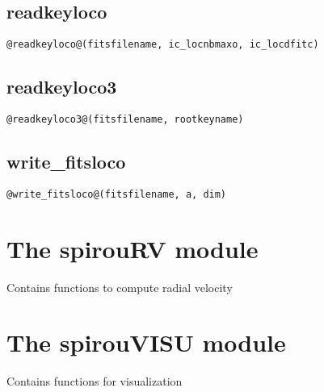 \subsection{readkeyloco}
\begin{lstlisting}[style=pythonstyle]
@readkeyloco@(fitsfilename, ic_locnbmaxo, ic_locdfitc)
\end{lstlisting}

\subsection{readkeyloco3}
\begin{lstlisting}[style=pythonstyle]
@readkeyloco3@(fitsfilename, rootkeyname)
\end{lstlisting}

\subsection{write\_fitsloco}
\begin{lstlisting}[style=pythonstyle]
@write_fitsloco@(fitsfilename, a, dim)
\end{lstlisting}


\clearpage
\newpage
\section{The spirouRV module}

Contains functions to compute radial velocity

\clearpage
\newpage
\section{The spirouVISU module}

Contains functions for visualization
